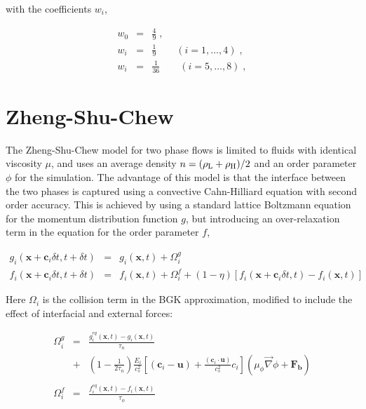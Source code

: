 \documentclass[12pt]{report}
\newcommand{\vect}[1]{\ensuremath{\mathrm{\mathbf{#1}}}}
\begin{document}
with the coefficients $w_i$,

\begin{eqnarray}
w_0 &=& \frac{4}{9}\;,\\
w_i &=& \frac{1}{9} \quad\quad (i = 1,\dots,4)\;,\\
w_i &=& \frac{1}{36} \quad\quad (i = 5,\dots,8)\;,
\end{eqnarray}


\section{Zheng-Shu-Chew}
\label{sec:zsc}
The Zheng-Shu-Chew model for two phase flows is limited to fluids with identical viscosity $\mu$, and uses an average density $n = (\rho_{\rm L} + \rho_{\rm H})/2$ and an order parameter $\phi$ for the simulation. The advantage of this model is that the interface between the two phases is captured using a convective Cahn-Hilliard equation with second order accuracy. This is achieved by using a standard lattice Boltzmann equation for the momentum distribution function $g$, but introducing an over-relaxation term in the equation for the order parameter $f$,

\begin{eqnarray}
    g_{i}(\vect{x}+\vect{c}_{i}\delta t,t+\delta t) &=&
	g_{i}(\vect{x},t) + \Omega_{i}^{g}\label{eqn:momentum_streaming}\\
    f_{i}(\vect{x}+\vect{c}_{i}\delta t,t+\delta t) &=&
    f_{i}(\vect{x},t) + \Omega_{i}^{f} + (1-\eta)[f_{i}(\vect{x}+\vect{c}_{i}\delta
    t,t)- f_{i}(\vect{x},t)]\label{eqn:phase_streaming}
\end{eqnarray}

Here $\Omega_{i}$ is the collision term in the BGK \cite{Bhatnagar1954} approximation, modified to include the effect of interfacial and external forces:

\begin{eqnarray}
    \Omega_{i}^{g} &=& \frac{g_{i}^{eq}(\vect{x},t)-g_{i}(\vect{x},t)}{\tau_{n}} \nonumber\\  
    &+&\left(1-\frac{1}{2\tau_{n}}\right)\frac{E_{i}}{c_s^2}\left[ \left(\vect{c}_i-\vect{u}\right) +
    \frac{(\vect{c}_i\cdot\vect{u})}{c_s^2}c_i \right]\left(\mu_{\phi}\vec{\nabla}\phi + \vect{F_b} \right) \label{eqn:momentum_collision}\\
    &&\nonumber\\
    \Omega_{i}^{f} &=& \frac{f_{i}^{eq}(\vect{x},t)-f_{i}(\vect{x},t)}{\tau_{\phi}}\label{eqn:phase_collision}
\end{eqnarray}
\end{document}
